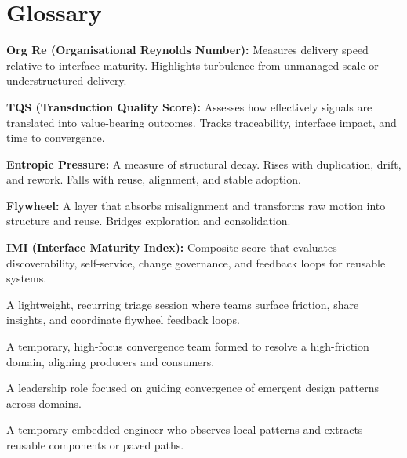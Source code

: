 \documentclass[12pt]{article}
\begin{document}
\newpage
\section*{Glossary}


\begin{conceptbox}
\textbf{Org Re (Organisational Reynolds Number):} Measures delivery speed relative to interface maturity. Highlights turbulence from unmanaged scale or understructured delivery.
\end{conceptbox}

\begin{conceptbox}
\textbf{TQS (Transduction Quality Score):} Assesses how effectively signals are translated into value-bearing outcomes. Tracks traceability, interface impact, and time to convergence.
\end{conceptbox}

\begin{conceptbox}
\textbf{Entropic Pressure:} A measure of structural decay. Rises with duplication, drift, and rework. Falls with reuse, alignment, and stable adoption.
\end{conceptbox}

\begin{conceptbox}
\textbf{Flywheel:} A layer that absorbs misalignment and transforms raw motion into structure and reuse. Bridges exploration and consolidation.
\end{conceptbox}

\begin{conceptbox}
\textbf{IMI (Interface Maturity Index):} Composite score that evaluates discoverability, self-service, change governance, and feedback loops for reusable systems.
\end{conceptbox}

\begin{description}[style=nextline]
  \item[Signal Clinic] A lightweight, recurring triage session where teams surface friction, share insights, and coordinate flywheel feedback loops.
  \item[Flow Cell] A temporary, high-focus convergence team formed to resolve a high-friction domain, aligning producers and consumers.
  \item[Pattern Shepherd] A leadership role focused on guiding convergence of emergent design patterns across domains.
  \item[Shadow Integrator] A temporary embedded engineer who observes local patterns and extracts reusable components or paved paths.
\end{description}
\end{document}
